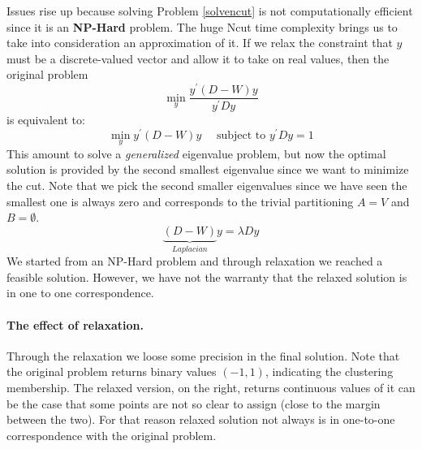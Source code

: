 Issues rise up because solving Problem \ref{solvencut} is not computationally efficient since it is an \textbf{NP-Hard} problem. The huge Ncut time complexity brings us to take into consideration an approximation of it. If we relax the constraint that $y$ must be a discrete-valued vector and allow it to take on real values, then the original problem
$$\min _ { y } \frac { y ^ { \prime } ( D - W ) y } { y ^ { \prime } D y }$$
is equivalent to:
$$\min _ { y } y ^ { \prime } ( D - W ) y \quad \text { subject to } y ^ { \prime } D y = 1$$
This amount to solve a \textit{generalized} eigenvalue problem, but now the optimal solution is provided by the second smallest eigenvalue since we want to minimize the cut. Note that we pick the second smaller eigenvalues since we have seen the smallest one is always zero and corresponds to the trivial partitioning $A=V$ and $B=\emptyset$.
$$\underbrace{(D-W)}_{Laplacian}y=\lambda D y$$
We started from an NP-Hard problem and through relaxation we reached a feasible solution. However, we have not the warranty that the relaxed solution is in one to one correspondence.
\paragraph*{The effect of relaxation.} Through the relaxation we loose some precision in the final solution. 
Note that the original problem returns binary values $(-1,1)$, indicating the clustering membership. The relaxed version, on the right, returns continuous values of it can be the case that some points are not so clear to assign (close to the margin between the two). For that reason relaxed solution not always is in one-to-one correspondence with the original problem.

